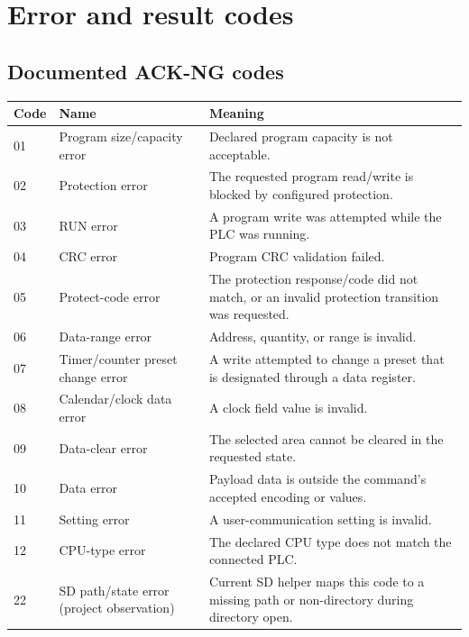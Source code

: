 \documentclass[10pt,letterpaper]{article}
\begin{document}
\section{Error and result codes}
\subsection{Documented ACK-NG codes}
\begin{longtable}{@{}p{1.3cm}p{5.0cm}p{9.5cm}@{}}
\toprule
Code & Name & Meaning \\
\midrule
01 & Program size/capacity error & Declared program capacity is not acceptable. \\
02 & Protection error & The requested program read/write is blocked by configured protection. \\
03 & RUN error & A program write was attempted while the PLC was running. \\
04 & CRC error & Program CRC validation failed. \\
05 & Protect-code error & The protection response/code did not match, or an invalid protection transition was requested. \\
06 & Data-range error & Address, quantity, or range is invalid. \\
07 & Timer/counter preset change error & A write attempted to change a preset that is designated through a data register. \\
08 & Calendar/clock data error & A clock field value is invalid. \\
09 & Data-clear error & The selected area cannot be cleared in the requested state. \\
10 & Data error & Payload data is outside the command's accepted encoding or values. \\
11 & Setting error & A user-communication setting is invalid. \\
12 & CPU-type error & The declared CPU type does not match the connected PLC. \\
22 & SD path/state error (project observation) & Current SD helper maps this code to a missing path or non-directory during directory open. \\
\bottomrule
\end{longtable}
\end{document}
